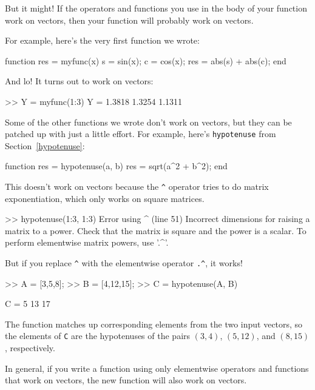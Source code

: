 But it might!  If the operators and functions
you use in the body of your function work on vectors, then your
function will probably work on vectors.

For example, here's the very first function we wrote:

\begin{code}
function res = myfunc(x)
    s = sin(x);
    c = cos(x);
    res = abs(s) + abs(c);
end
\end{code}

And lo!  It turns out to work on vectors:

\begin{code}
>> Y = myfunc(1:3)
Y = 1.3818    1.3254    1.1311
\end{code}

Some of the other functions we wrote don't work on vectors,
but they can be patched up with just a little effort.  For example,
here's {\tt hypotenuse} from Section~\ref{hypotenuse}:

\begin{code}
function res = hypotenuse(a, b)
    res = sqrt(a^2 + b^2);
end
\end{code}

This doesn't work on vectors because the \verb+^+ operator
tries to do matrix exponentiation, which only works on
square matrices.


\begin{code}
>> hypotenuse(1:3, 1:3)
Error using  ^  (line 51)
Incorrect dimensions for raising a matrix to a power. 
Check that the matrix is square and the power is a scalar. 
To perform elementwise matrix powers, use '.^'.
\end{code}

But if you replace \verb+^+ with the elementwise operator
\verb+.^+, it works!


\begin{code}
>> A = [3,5,8];
>> B = [4,12,15];
>> C = hypotenuse(A, B)

C = 5    13    17
\end{code}

The function matches up corresponding elements from the two
input vectors, so the elements of {\tt C} are the hypotenuses of
the pairs $(3,4)$, $(5,12)$, and $(8,15)$, respectively.

In general, if you write a function using only elementwise
operators and functions that work on vectors, the new
function will also work on vectors.


